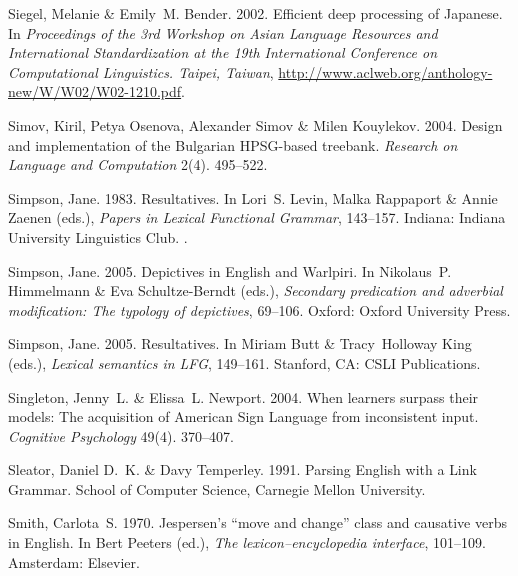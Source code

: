 \begin{thebibliography}{1420}
Siegel, Melanie \& Emily~M. Bender. 2002.
\newblock Efficient deep processing of {Japanese}.
\newblock In \emph{Proceedings of the {3rd Workshop on Asian Language Resources
  and International Standardization at the 19th International Conference on
  Computational Linguistics. Taipei, Taiwan}},
  \urlprefix\url{http://www.aclweb.org/anthology-new/W/W02/W02-1210.pdf}.

Simov, Kiril, Petya Osenova, Alexander Simov \& Milen Kouylekov. 2004.
\newblock Design and implementation of the {Bulgarian HPSG}-based treebank.
\newblock \emph{Research on Language and Computation} 2(4). 495--522.

Simpson, Jane. 1983.
\newblock Resultatives.
\newblock In Lori~S. Levin, Malka Rappaport \& Annie Zaenen (eds.),
  \emph{Papers in {Lexical Functional Grammar}}, 143--157. Indiana: Indiana
  University Linguistics Club.
\newblock \reprint {}.

Simpson, Jane. 2005{}.
\newblock Depictives in {English} and {Warlpiri}.
\newblock In Nikolaus~P. Himmelmann \& Eva Schultze-Berndt (eds.),
  \emph{Secondary predication and adverbial modification: {The} typology of
  depictives}, 69--106. Oxford: Oxford University Press.

Simpson, Jane. 2005{}.
\newblock Resultatives.
\newblock In Miriam Butt \& Tracy~Holloway King (eds.), \emph{Lexical semantics
  in {LFG}}, 149--161. Stanford, CA: CSLI Publications.

Singleton, Jenny~L. \& Elissa~L. Newport. 2004.
\newblock When learners surpass their models: {The} acquisition of {American
  Sign Language} from inconsistent input.
\newblock \emph{Cognitive Psychology} 49(4). 370--407.

Sleator, Daniel D.~K. \& Davy Temperley. 1991.
\newblock Parsing {English} with a {Link Grammar}.
 School of Computer Science, Carnegie Mellon
  University.

Smith, Carlota~S. 1970.
\newblock Jespersen's ``move and change'' class and causative verbs in
  {English}.
\newblock In Bert Peeters (ed.), \emph{The lexicon--encyclopedia interface},
  101--109. Amsterdam: Elsevier.


\end{thebibliography}
